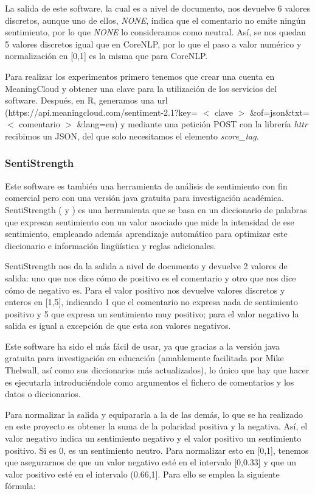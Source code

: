 La salida de este software, la cual es a nivel de documento, nos devuelve 6 valores discretos, aunque uno de ellos, \textit{NONE}, indica que el comentario no emite ningún sentimiento, por lo que \textit{NONE} lo consideramos como neutral. Así, se nos quedan 5 valores discretos igual que en CoreNLP, por lo que el paso a valor numérico y normalización en [0,1] es la misma que para CoreNLP.

Para realizar los experimentos primero tenemos que crear una cuenta en MeaningCloud y obtener una clave para la utilización de los servicios del software. Después, en R, generamos una url (https://api.meaningcloud.com/sentiment-2.1?key= $<$ clave $>$ \&of=json\&txt= $<$ comentario $>$ \&lang=en) y mediante una petición POST con la librería \textit{httr} recibimos un JSON, del que solo necesitamos el elemento \textit{score\_tag}.

\subsubsection{SentiStrength}
Este software es también una herramienta de análisis de sentimiento con fin comercial pero con una versión java gratuita para investigación académica. SentiStrength (\cite{senti} y \cite{senti2}) es una herramienta que se basa en un diccionario de palabras que expresan sentimiento con un valor asociado que mide la intensidad de ese sentimiento, empleando además aprendizaje automático para optimizar este diccionario e información lingüística y reglas adicionales.

SentiStrength nos da la salida a nivel de documento y devuelve 2 valores de salida: uno que nos dice cómo de positivo es el comentario y otro que nos dice cómo de negativo es. Para el valor positivo nos devuelve valores discretos y enteros en [1,5], indicando 1 que el comentario no expresa nada de sentimiento positivo y 5 que expresa un sentimiento muy positivo; para el valor negativo la salida es igual a excepción de que esta son valores negativos.

Este software ha sido el más fácil de usar, ya que gracias a la versión java gratuita para investigación en educación (amablemente facilitada por Mike Thelwall, así como sus diccionarios más actualizados), lo único que hay que hacer es ejecutarla introduciéndole como argumentos el fichero de comentarios y los datos o diccionarios.

Para normalizar la salida y equipararla a la de las demás, lo que se ha realizado en este proyecto es obtener la suma de la polaridad positiva y la negativa. Así, el valor negativo indica un sentimiento negativo y el valor positivo un sentimiento positivo. Si es 0, es un sentimiento neutro. Para normalizar esto en [0,1], tenemos que asegurarnos de que un valor negativo esté en el intervalo [0,0.33] y que un valor positivo esté en el intervalo (0.66,1]. Para ello se emplea la siguiente fórmula:


